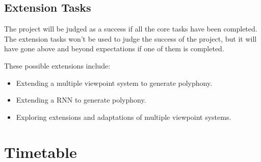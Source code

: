 \documentclass[12pt,a4paper,twoside]{article}
\begin{document}
\subsection*{Extension Tasks}

The project will be judged as a success if all the core tasks have been
completed. The extension tasks won't be used to judge the success of the
project, but it will have gone above and beyond expectations if one of them is
completed.

These possible extensions include:
\begin{itemize}
	\item Extending a multiple viewpoint system to generate polyphony.
	\item Extending a RNN to generate polyphony.
	\item Exploring extensions and adaptations of multiple viewpoint
		systems.
\end{itemize}

\newpage

\section*{Timetable}
\end{document}
